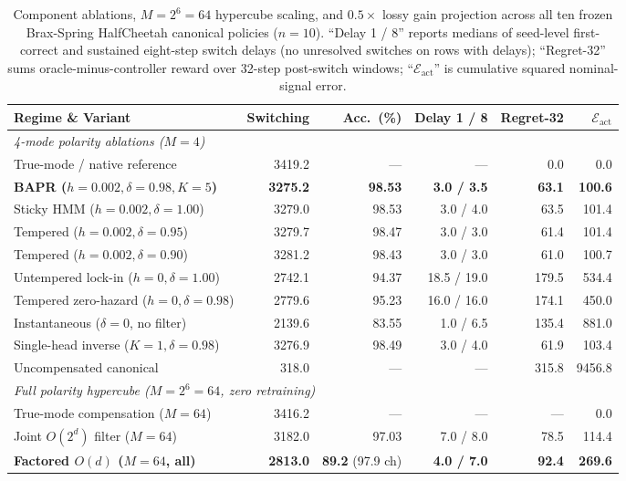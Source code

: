 \documentclass[twoside,11pt]{article}
\begin{document}
\begin{table}[t]
\centering
\footnotesize
\setlength{\tabcolsep}{3pt}
\caption{Component ablations, $M=2^6=64$ hypercube scaling, and $0.5\times$ lossy gain projection across all ten frozen Brax-Spring HalfCheetah canonical policies ($n=10$). ``Delay 1 / 8'' reports medians of seed-level first-correct and sustained eight-step switch delays (no unresolved switches on rows with delays); ``Regret-32'' sums oracle-minus-controller reward over 32-step post-switch windows; ``$\mathcal{E}_{\mathrm{act}}$'' is cumulative squared nominal-signal error.}
\label{tab:v50_ablations}
\begin{tabular}{lrrrrr}
\toprule
Regime \& Variant & Switching & Acc.\ (\%) & Delay 1 / 8 & Regret-32 & $\mathcal{E}_{\mathrm{act}}$ \\
\midrule
\multicolumn{6}{l}{\emph{4-mode polarity ablations ($M=4$)}} \\
True-mode / native reference & 3419.2 & --- & --- & 0.0 & 0.0 \\
\textbf{BAPR ($h=0.002,\delta=0.98,K=5$)} & \textbf{3275.2} & \textbf{98.53} & \textbf{3.0 / 3.5} & \textbf{63.1} & \textbf{100.6} \\
Sticky HMM ($h=0.002,\delta=1.00$) & 3279.0 & 98.53 & 3.0 / 4.0 & 63.5 & 101.4 \\
Tempered ($h=0.002,\delta=0.95$) & 3279.7 & 98.47 & 3.0 / 3.0 & 61.4 & 101.4 \\
Tempered ($h=0.002,\delta=0.90$) & 3281.2 & 98.43 & 3.0 / 3.0 & 61.0 & 100.7 \\
Untempered lock-in ($h=0,\delta=1.00$) & 2742.1 & 94.37 & 18.5 / 19.0 & 179.5 & 534.4 \\
Tempered zero-hazard ($h=0,\delta=0.98$) & 2779.6 & 95.23 & 16.0 / 16.0 & 174.1 & 450.0 \\
Instantaneous ($\delta=0$, no filter) & 2139.6 & 83.55 & 1.0 / 6.5 & 135.4 & 881.0 \\
Single-head inverse ($K=1,\delta=0.98$) & 3276.9 & 98.49 & 3.0 / 4.0 & 61.9 & 103.4 \\
Uncompensated canonical & 318.0 & --- & --- & 315.8 & 9456.8 \\
\midrule
\multicolumn{6}{l}{\emph{Full polarity hypercube ($M=2^6=64$, zero retraining)}} \\
True-mode compensation ($M=64$) & 3416.2 & --- & --- & --- & 0.0 \\
Joint $O(2^d)$ filter ($M=64$) & 3182.0 & 97.03 & 7.0 / 8.0 & 78.5 & 114.4 \\
\textbf{Factored $O(d)$ ($M=64$, all)} & \textbf{2813.0} & \textbf{89.2} (97.9 ch) & \textbf{4.0 / 7.0} & \textbf{92.4} & \textbf{269.6} \\

\end{tabular}
\end{table}
\end{document}
